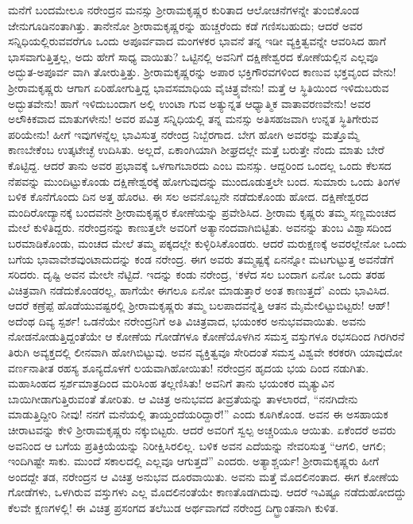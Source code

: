 ಮನೆಗೆ ಬಂದಮೇಲೂ ನರೇಂದ್ರನ ಮನಸ್ಸು ಶ್ರೀರಾಮಕೃಷ್ಣರ ಕುರಿತಾದ ಆಲೋಚನೆಗಳನ್ನೇ ತುಂಬಿಕೊಂಡ ಜೇನುಗೂಡಿನಂತಾಗಿತ್ತು. ತಾನೇನೋ ಶ್ರೀರಾಮಕೃಷ್ಣರನ್ನು ಹುಚ್ಚರೆಂದು ಕಡೆ ಗಣಿಸಬಹುದು; ಆದರೆ ಅವರ ಸನ್ನಿಧಿಯಲ್ಲಿರುವವರೆಗೂ ಒಂದು ಅಪೂರ್ವವಾದ ಮಂಗಳಕರ ಭಾವನೆ ತನ್ನ ಇಡೀ ವ್ಯಕ್ತಿತ್ವವನ್ನೇ ಆವರಿಸಿದ ಹಾಗೆ ಭಾಸವಾಗುತ್ತಿತ್ತಲ್ಲ, ಅದು ಹೇಗೆ ಸಾಧ್ಯ ವಾಯಿತು? ಒಟ್ಟಿನಲ್ಲಿ ಅವನಿಗೆ ದಕ್ಷಿಣೇಶ್ವರದ ಕೋಣೆಯಲ್ಲಿನ ಎಲ್ಲವೂ ಅದ್ಭುತ-ಅಪೂರ್ವ ವಾಗಿ ತೋರುತ್ತಿತ್ತು. ಶ್ರೀರಾಮಕೃಷ್ಣರನ್ನು ಅಪಾರ ಭಕ್ತಿಗೌರವಗಳಿಂದ ಕಾಣುವ ಭಕ್ತವೃಂದ ವೇನು! ಶ್ರೀರಾಮಕೃಷ್ಣರು ಆಗಾಗ ಏರಿಹೋಗುತ್ತಿದ್ದ ಭಾವಸಮಾಧಿಯ ವೈಚಿತ್ರ್ಯವೇನು! ಮತ್ತೆ ಆ ಸ್ಥಿತಿಯಿಂದ ಇಳಿದುಬರುವ ಅದ್ಭುತವೇನು! ಹಾಗೆ ಇಳಿದುಬಂದಾಗ ಅಲ್ಲಿ ಉಂಟಾ ಗುವ ಅತ್ಯುನ್ನತ ಆಧ್ಯಾತ್ಮಿಕ ವಾತಾವರಣವೇನು! ಅವರ ಅಲೌಕಿಕವಾದ ಮಾತುಗಳೇನು! ಅವರ ಪವಿತ್ರ ಸನ್ನಿಧಿಯಲ್ಲಿ ತನ್ನ ಮನಸ್ಸು ಅತಿಸಹಜವಾಗಿ ಉನ್ನತ ಸ್ಥಿತಿಗೇರುವ ಪರಿಯೇನು! ಹೀಗೆ ಇವುಗಳನ್ನೆಲ್ಲ ಭಾವಿಸುತ್ತ ನರೇಂದ್ರ ನಿಬ್ಬೆರಗಾದ. ಬೇಗ ಹೋಗಿ ಅವರನ್ನು ಮತ್ತೊಮ್ಮೆ ಕಾಣಬೇಕೆಂಬ ಉತ್ಕಟೇಚ್ಛೆ ಉದಿಸಿತು. ಅಲ್ಲದೆ, ಏಕಾಂಗಿಯಾಗಿ ಶೀಘ್ರದಲ್ಲೇ ಮತ್ತೆ ಬರುತ್ತೇ ನೆಂದು ಮಾತು ಬೇರೆ ಕೊಟ್ಟಿದ್ದ. ಆದರೆ ತಾನು ಅವರ ಪ್ರಭಾವಕ್ಕೆ ಒಳಗಾಗಬಾರದು ಎಂಬ ಮನಸ್ಸು. ಆದ್ದರಿಂದ ಒಂದಲ್ಲ ಒಂದು ಕೆಲಸದ ನೆಪವನ್ನು ಮುಂದಿಟ್ಟುಕೊಂಡು ದಕ್ಷಿಣೇಶ್ವರಕ್ಕೆ ಹೋಗುವುದನ್ನು ಮುಂದೂಡುತ್ತಲೇ ಬಂದ. ಸುಮಾರು ಒಂದು ತಿಂಗಳ ಬಳಿಕ ಕೊನೆಗೊಂದು ದಿನ ಅತ್ತ ಹೊರಟ. ಈ ಸಲ ಅವನೊಬ್ಬನೇ ನಡೆದುಕೊಂಡು ಹೋದ. ದಕ್ಷಿಣೇಶ್ವರದ ಮಂದಿರೋದ್ಯಾನಕ್ಕೆ ಬಂದವನೇ ಶ್ರೀರಾಮಕೃಷ್ಣರ ಕೋಣೆಯನ್ನು ಪ್ರವೇಶಿಸಿದ. ಶ್ರೀರಾಮ ಕೃಷ್ಣರು ತಮ್ಮ ಸಣ್ಣಮಂಚದ ಮೇಲೆ ಕುಳಿತಿದ್ದರು. ನರೇಂದ್ರನನ್ನು ಕಾಣುತ್ತಲೇ ಅವರಿಗೆ ಅತ್ಯಾನಂದವಾಗಿಬಿಟ್ಟಿತು. ಅವನನ್ನು ತುಂಬ ವಿಶ್ವಾಸದಿಂದ ಬರಮಾಡಿಕೊಂಡು, ಮಂಚದ ಮೇಲೆ ತಮ್ಮ ಪಕ್ಕದಲ್ಲೇ ಕುಳ್ಳಿರಿಸಿಕೊಂಡರು. ಆದರೆ ಮರುಕ್ಷಣಕ್ಕೆ ಅವರಲ್ಲೇನೋ ಒಂದು ಬಗೆಯ ಭಾವಾವೇಶವುಂಟಾದುದನ್ನು ಕಂಡ ನರೇಂದ್ರ. ಈಗ ಅವರು ತಮ್ಮಷ್ಟಕ್ಕೆ ಏನನ್ನೋ ಮಟಗುಟ್ಟುತ್ತ ಅವನೆಡೆಗೆ ಸರಿದರು. ದೃಷ್ಟಿ ಅವನ ಮೇಲೇ ನೆಟ್ಟಿದೆ. ಇದನ್ನು ಕಂಡು ನರೇಂದ್ರ, ‘ಕಳೆದ ಸಲ ಬಂದಾಗ ಏನೋ ಒಂದು ತರಹ ವಿಚಿತ್ರವಾಗಿ ನಡೆದುಕೊಂಡರಲ್ಲ, ಹಾಗೆಯೇ ಈಗಲೂ ಏನೋ ಮಾಡುತ್ತಾರೆ ಅಂತ ಕಾಣುತ್ತದೆ’ ಎಂದು ಭಾವಿಸಿದ. ಆದರೆ ಕಣ್ರೆಪ್ಪೆ ಹೊಡೆಯುವಷ್ಟರಲ್ಲಿ ಶ್ರೀರಾಮಕೃಷ್ಣರು ತಮ್ಮ ಬಲಪಾದವನ್ನೆತ್ತಿ ಆತನ ಮೈಮೇಲಿಟ್ಟುಬಿಟ್ಟರು! ಆಹ್! ಅದೆಂಥ ದಿವ್ಯ ಸ್ಪರ್ಶ! ಒಡನೆಯೇ ನರೇಂದ್ರನಿಗೆ ಅತಿ ವಿಚಿತ್ರವಾದ, ಭಯಂಕರ ಅನುಭವವಾಯಿತು. ಅವನು ನೋಡನೋಡುತ್ತಿದ್ದಂತೆಯೇ ಆ ಕೋಣೆಯ ಗೋಡೆಗಳೂ ಕೋಣೆಯೊಳಗಿನ ಸಮಸ್ತ ವಸ್ತುಗಳೂ ರಭಸದಿಂದ ಗಿರಗಿರನೆ ತಿರುಗಿ ಅವ್ಯಕ್ತದಲ್ಲಿ ಲೀನವಾಗಿ ಹೋಗಿಬಿಟ್ಟುವು. ಅವನ ವ್ಯಕ್ತಿತ್ವವೂ ಸೇರಿದಂತೆ ಸಮಸ್ತ ವಿಶ್ವವೇ ಕರಕರಗಿ ಯಾವುದೋ ವರ್ಣನಾತೀತ ರಹಸ್ಯ ಶೂನ್ಯದೊಳಗೆ ಲಯವಾಗಿಹೋಯಿತು! ನರೇಂದ್ರನ ಹೃದಯ ಭಯ ದಿಂದ ನಡುಗಿತು. ಮಹಾಸಿಂಹದ ಸ್ಪರ್ಶಮಾತ್ರದಿಂದ ಮರಿಸಿಂಹ ತಲ್ಲಣಿಸಿತು! ಅವನಿಗೆ ತಾನು ಭಯಂಕರ ಮೃತ್ಯುವಿನ ಬಾಯಿಗೀಡಾಗುತ್ತಿರುವಂತೆ ತೋರಿತು. ಆ ವಿಚಿತ್ರ ಅನುಭವದ ತೀವ್ರತೆಯನ್ನು ತಾಳಲಾರದೆ, “ನನಗಿದೇನು ಮಾಡುತ್ತಿದ್ದೀರಿ ನೀವು! ನನಗೆ ಮನೆಯಲ್ಲಿ ತಾಯ್ತಂದೆಯರಿದ್ದಾರೆ!” ಎಂದು ಕೂಗಿಕೊಂಡ. ಅವನ ಈ ಅಸಹಾಯಕ ಚೀರಾಟವನ್ನು ಕೇಳಿ ಶ್ರೀರಾಮಕೃಷ್ಣರು ನಕ್ಕುಬಿಟ್ಟರು. ಆದರೆ ಅವರಿಗೆ ಸ್ವಲ್ಪ ಅಚ್ಚರಿಯೂ ಆಯಿತು. ಏಕೆಂದರೆ ಅವರು ಅವನಿಂದ ಆ ಬಗೆಯ ಪ್ರತಿಕ್ರಿಯೆಯನ್ನು ನಿರೀಕ್ಷಿಸಿರಲಿಲ್ಲ. ಬಳಿಕ ಅವನ ಎದೆಯನ್ನು ನೇವರಿಸುತ್ತ “ಆಗಲಿ, ಆಗಲಿ; ಇಂದಿಗಿಷ್ಟೇ ಸಾಕು. ಮುಂದೆ ಸಕಾಲದಲ್ಲಿ ಎಲ್ಲವೂ ಆಗುತ್ತದೆ” ಎಂದರು. ಅತ್ಯಾಶ್ಚರ್ಯ! ಶ್ರೀರಾಮಕೃಷ್ಣರು ಹೀಗೆ ಅಂದದ್ದೇ ತಡ, ನರೇಂದ್ರನ ಆ ವಿಚಿತ್ರ ಅನುಭವ ದೂರವಾಯಿತು. ಅವನು ಮತ್ತೆ ಮೊದಲಿನಂತಾದ. ಈಗ ಕೋಣೆಯ ಗೋಡೆಗಳು, ಒಳಗಿರುವ ವಸ್ತುಗಳು ಎಲ್ಲ ಮೊದಲಿನಂತೆಯೇ ಕಾಣತೊಡಗಿದುವು. ಆದರೆ ಇವಿಷ್ಟೂ ನಡೆದುಹೋದದ್ದು ಕೆಲವೇ ಕ್ಷಣಗಳಲ್ಲಿ! ಈ ವಿಚಿತ್ರ ಪ್ರಸಂಗದ ತಲೆಬುಡ ಅರ್ಥವಾಗದೆ ನರೇಂದ್ರ ದಿಗ್ಭ್ರಾಂತನಾಗಿ ಕುಳಿತ.

